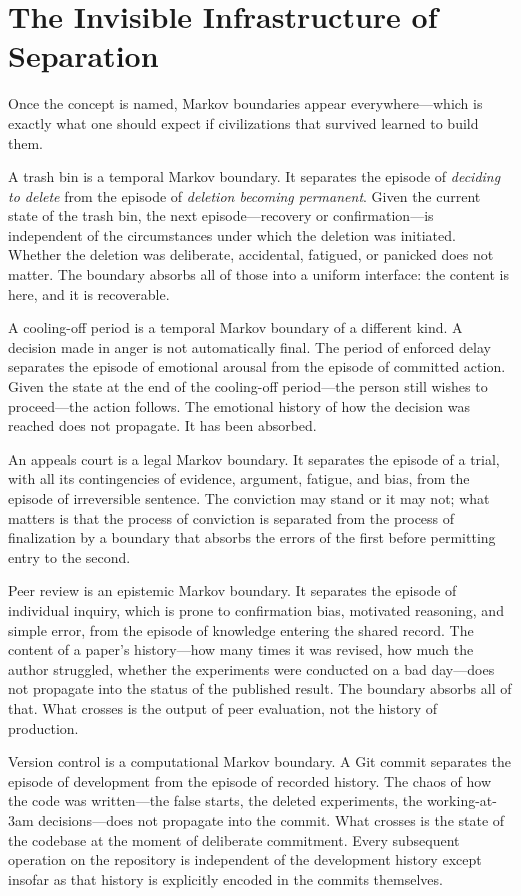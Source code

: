 \documentclass[12pt, a4paper]{article}
\begin{document}
\section{The Invisible Infrastructure of Separation}

Once the concept is named, Markov boundaries appear everywhere---which
is exactly what one should expect if civilizations that survived
learned to build them.

A trash bin is a temporal Markov boundary. It separates the episode
of \emph{deciding to delete} from the episode of \emph{deletion
becoming permanent}. Given the current state of the trash bin, the
next episode---recovery or confirmation---is independent of the
circumstances under which the deletion was initiated. Whether the
deletion was deliberate, accidental, fatigued, or panicked does not
matter. The boundary absorbs all of those into a uniform interface:
the content is here, and it is recoverable.

A cooling-off period is a temporal Markov boundary of a different
kind. A decision made in anger is not automatically final. The period
of enforced delay separates the episode of emotional arousal from the
episode of committed action. Given the state at the end of the
cooling-off period---the person still wishes to proceed---the action
follows. The emotional history of how the decision was reached does
not propagate. It has been absorbed.

An appeals court is a legal Markov boundary. It separates the episode
of a trial, with all its contingencies of evidence, argument, fatigue,
and bias, from the episode of irreversible sentence. The conviction
may stand or it may not; what matters is that the process of
conviction is separated from the process of finalization by a
boundary that absorbs the errors of the first before permitting entry
to the second.

Peer review is an epistemic Markov boundary. It separates the episode
of individual inquiry, which is prone to confirmation bias, motivated
reasoning, and simple error, from the episode of knowledge
entering the shared record. The content of a paper's history---how
many times it was revised, how much the author struggled, whether the
experiments were conducted on a bad day---does not propagate into the
status of the published result. The boundary absorbs all of that. What
crosses is the output of peer evaluation, not the history of
production.

Version control is a computational Markov boundary. A Git commit
separates the episode of development from the episode of recorded
history. The chaos of how the code was written---the false starts, the
deleted experiments, the working-at-3am decisions---does not propagate
into the commit. What crosses is the state of the codebase at the
moment of deliberate commitment. Every subsequent operation on the
repository is independent of the development history except insofar
as that history is explicitly encoded in the commits themselves.
\end{document}
